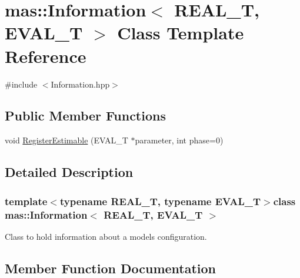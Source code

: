 \hypertarget{classmas_1_1_information}{}\section{mas\+:\+:Information$<$ R\+E\+A\+L\+\_\+\+T, E\+V\+A\+L\+\_\+\+T $>$ Class Template Reference}
\label{classmas_1_1_information}


{\ttfamily \#include $<$Information.\+hpp$>$}

\subsection*{Public Member Functions}
\begin{DoxyCompactItemize}
\item 
void \hyperlink{classmas_1_1_information_a94e2ca5cb7f84694c300a351243c3a3b}{Register\+Estimable} (E\+V\+A\+L\+\_\+\+T $\ast$parameter, int phase=0)
\end{DoxyCompactItemize}


\subsection{Detailed Description}
\subsubsection*{template$<$typename R\+E\+A\+L\+\_\+\+T, typename E\+V\+A\+L\+\_\+\+T$>$class mas\+::\+Information$<$ R\+E\+A\+L\+\_\+\+T, E\+V\+A\+L\+\_\+\+T $>$}

Class to hold information about a models configuration. 

\subsection{Member Function Documentation}
\hypertarget{classmas_1_1_information_a94e2ca5cb7f84694c300a351243c3a3b}{}
